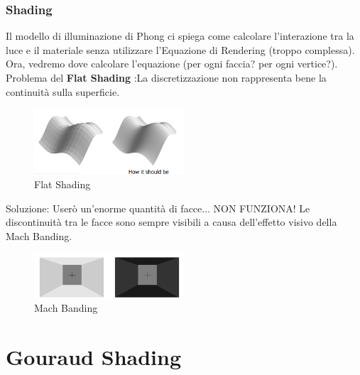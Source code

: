 \subsubsection{Shading}
Il modello di illuminazione di Phong ci spiega come calcolare l'interazione tra la luce e il materiale senza utilizzare l'Equazione di Rendering (troppo complessa).
Ora, vedremo dove calcolare l'equazione (per ogni faccia? per ogni vertice?).
Problema del \textbf{Flat Shading} :La discretizzazione non rappresenta bene la continuità sulla superficie.
\begin{figure}[H]
    \centering
    \includegraphics[width=0.5\textwidth]{images/Shading.png} 
    \caption{Flat Shading}
    \label{fig:immagine}
\end{figure}
Soluzione: Userò un'enorme quantità di facce...
NON FUNZIONA! Le discontinuità tra le facce sono sempre visibili a causa dell'effetto visivo della Mach Banding. \\
\begin{figure}[H]
    \centering
    \includegraphics[width=0.5\textwidth]{images/MatchBand.png} 
    \caption{Mach Banding}
    \label{fig:immagine}
\end{figure}
\section{Gouraud Shading}

